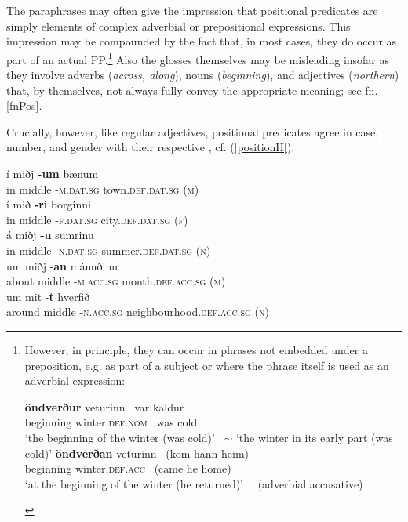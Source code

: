 \documentclass[output=paper,colorlinks,citecolor=brown]{langscibook}
\begin{document}
The paraphrases may often give the impression that positional predicates are simply elements of complex adverbial or  prepositional expressions.  
This impression may be compounded by the fact that, in most cases, they do occur as part of an actual PP.\footnote{However, in principle, they can occur in  phrases not embedded under a preposition, e.g. as part of a subject or where the  phrase itself is used as an adverbial expression: 

\begin{exe}
  \ex\label{positionB}
   \begin{xlist} 
    \ex \gll \textbf{öndverður}  veturinn  \  var kaldur  \\
         beginning winter.\textsc{def}.\textsc{nom} \  was cold   \\
      \glt `the  beginning of the winter (was cold)' \ $\sim$ `the winter in its early part (was cold)'
    \ex \gll \textbf{öndverðan}  veturinn \  ({kom hann heim}) \\
       beginning   winter.\textsc{def}.\textsc{acc} \ ({came he home})  \\
      \glt `at the beginning  of the winter (he returned)'  \ \ (adverbial accusative) 
  \end{xlist}
\end{exe} }  
Also the glosses themselves may be misleading insofar as they involve adverbs (\textit{across, along}), nouns (\textit{beginning}), and adjectives (\textit{northern}) that, by themselves, not always fully convey the appropriate meaning; see  fn. \ref{fnPos}.

Crucially, however, like regular adjectives, positional predicates agree in case, number, and gender with their respective , cf. (\ref{positionII}).

\begin{exe}
  \ex\label{positionII}
   \begin{xlist}  
    \ex \gll í miðj \textbf{-um} bænum   \\ 
     in  middle  -\textsc{m.dat.sg} town.\textsc{def}.\textsc{dat.sg (m)} \\
    \ex \gll í mið \textbf{-ri} borginni   \\ 
     in middle -\textsc{f.dat.sg}  city.\textsc{def}.\textsc{dat.sg (f)} \\
    \ex \gll á miðj \textbf{-u} sumrinu   \\ 
     in  middle -\textsc{n.dat.sg} summer.\textsc{def}.\textsc{dat.sg (n)} \\
    \ex \gll um miðj -\textbf{an} mánuðinn   \\ 
      about  middle -\textsc{m.acc.sg}  month.\textsc{def}.\textsc{acc.sg (m)} \\
    \ex \gll um mit -\textbf{t} hverfið   \\ 
      around middle -\textsc{n.acc.sg} neighbourhood.\textsc{def}.\textsc{acc.sg  (n)} \\
  \end{xlist}
\end{exe} 
\end{document}
